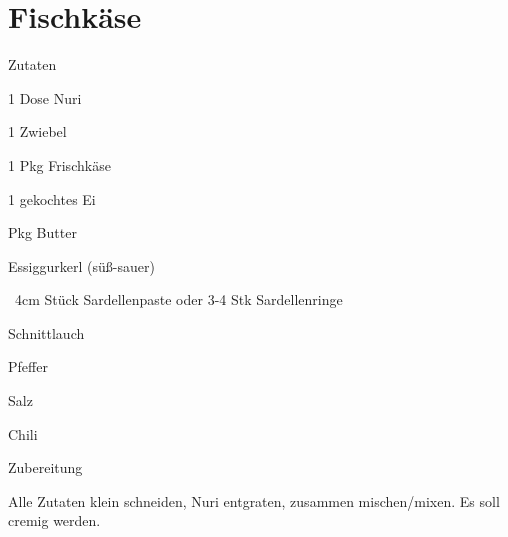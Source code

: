 \chapter*{Fischkäse}
\begin{multicols}{2}
 {\Large Zutaten}
 \begin{Zutaten}
		\item 1 Dose Nuri
		\item 1 Zwiebel
		\item 1 Pkg Frischkäse
		\item 1 gekochtes Ei
		\item {} Pkg Butter
		\item {} Essiggurkerl (süß-sauer)
		\item ~4cm Stück Sardellenpaste oder 3-4 Stk Sardellenringe
		\item Schnittlauch
		\item Pfeffer
		\item Salz
		\item Chili
		
		
\end{Zutaten}
\columnbreak
\end{multicols}

{\Large Zubereitung} \newline
\begin{addmargin}[1cm]{0cm}
Alle Zutaten klein schneiden, Nuri entgraten, zusammen mischen/mixen.\newline
Es soll cremig werden.

	
\end{addmargin}
